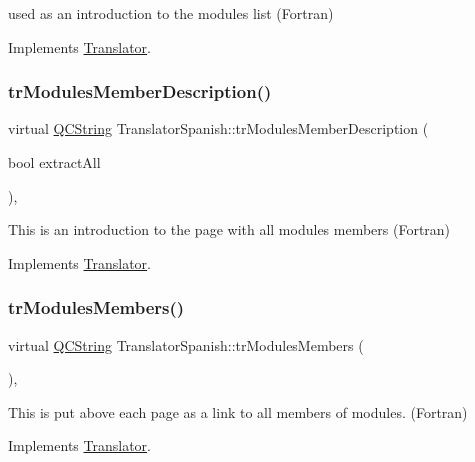 used as an introduction to the modules list (Fortran) 

Implements \mbox{\hyperlink{class_translator}{Translator}}.

\mbox{\label{class_translator_spanish_af3779143cd7c53a8f0c68a2e5d20e77e}} 
\subsubsection{\texorpdfstring{trModulesMemberDescription()}{trModulesMemberDescription()}}
{\footnotesize\ttfamily virtual \mbox{\hyperlink{class_q_c_string}{Q\+C\+String}} Translator\+Spanish\+::tr\+Modules\+Member\+Description (\begin{DoxyParamCaption}\item[{bool}]{extract\+All }\end{DoxyParamCaption})\hspace{0.3cm}{\ttfamily [inline]}, {\ttfamily [virtual]}}

This is an introduction to the page with all modules members (Fortran) 

Implements \mbox{\hyperlink{class_translator}{Translator}}.

\mbox{\label{class_translator_spanish_ac68a672026f4329fc911dec0b41c37ef}} 
\subsubsection{\texorpdfstring{trModulesMembers()}{trModulesMembers()}}
{\footnotesize\ttfamily virtual \mbox{\hyperlink{class_q_c_string}{Q\+C\+String}} Translator\+Spanish\+::tr\+Modules\+Members (\begin{DoxyParamCaption}{ }\end{DoxyParamCaption})\hspace{0.3cm}{\ttfamily [inline]}, {\ttfamily [virtual]}}

This is put above each page as a link to all members of modules. (Fortran) 

Implements \mbox{\hyperlink{class_translator}{Translator}}.

